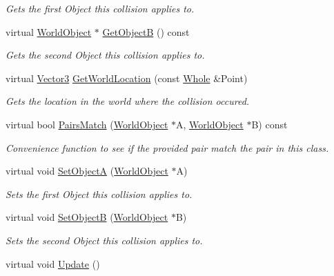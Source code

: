 \begin{DoxyCompactItemize}
\begin{DoxyCompactList}\small\item\em Gets the first Object this collision applies to. \item\end{DoxyCompactList}\item 
virtual \hyperlink{classMezzanine_1_1WorldObject}{WorldObject} $\ast$ \hyperlink{classMezzanine_1_1Collision_ac86914ea74f944491a28c07f50bd3107}{GetObjectB} () const 
\begin{DoxyCompactList}\small\item\em Gets the second Object this collision applies to. \item\end{DoxyCompactList}\item 
virtual \hyperlink{classMezzanine_1_1Vector3}{Vector3} \hyperlink{classMezzanine_1_1Collision_abefbe2ba9b0aaa1830be4f1070c44480}{GetWorldLocation} (const \hyperlink{namespaceMezzanine_adcbb6ce6d1eb4379d109e51171e2e493}{Whole} \&Point)
\begin{DoxyCompactList}\small\item\em Gets the location in the world where the collision occured. \item\end{DoxyCompactList}\item 
virtual bool \hyperlink{classMezzanine_1_1Collision_ae9eb0637ebd2e5dd47992278e4776e01}{PairsMatch} (\hyperlink{classMezzanine_1_1WorldObject}{WorldObject} $\ast$A, \hyperlink{classMezzanine_1_1WorldObject}{WorldObject} $\ast$B) const 
\begin{DoxyCompactList}\small\item\em Convenience function to see if the provided pair match the pair in this class. \item\end{DoxyCompactList}\item 
virtual void \hyperlink{classMezzanine_1_1Collision_a5503aa0fdc08e9ee41205478fc3c3bbc}{SetObjectA} (\hyperlink{classMezzanine_1_1WorldObject}{WorldObject} $\ast$A)
\begin{DoxyCompactList}\small\item\em Sets the first Object this collision applies to. \item\end{DoxyCompactList}\item 
virtual void \hyperlink{classMezzanine_1_1Collision_a4254bbe27f1d7362d79cecd46d6d2b24}{SetObjectB} (\hyperlink{classMezzanine_1_1WorldObject}{WorldObject} $\ast$B)
\begin{DoxyCompactList}\small\item\em Sets the second Object this collision applies to. \item\end{DoxyCompactList}\item 
\hypertarget{classMezzanine_1_1Collision_afee98e7728b4f2a4865a2ef38a051577}{
virtual void \hyperlink{classMezzanine_1_1Collision_afee98e7728b4f2a4865a2ef38a051577}{Update} ()}
\label{classMezzanine_1_1Collision_afee98e7728b4f2a4865a2ef38a051577}


\end{DoxyCompactItemize}
